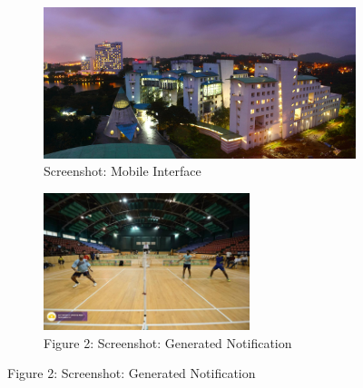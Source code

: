 \documentclass[12pt]{article}
\begin{document}
\begin{figure}[!h]
\captionsetup{width = .5\linewidth}
\begin{subfigure}[t]{.5\textwidth}
  \centering
  \includegraphics[width=.65\linewidth , height = 4 cm]{3}
  \caption*{ Screenshot: Mobile
Interface}
  \label{fig:sub1}
\end{subfigure}%
\begin{subfigure}[t]{.5\textwidth}
  \centering
  \includegraphics[width=.65\linewidth , height = 4cm]{4}
  \caption*{Figure 2: Screenshot: Generated Notification}
  \label{fig:sub2}
\end{subfigure}
\end{figure}
\end{document}
